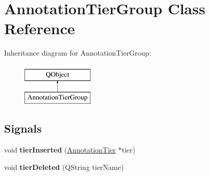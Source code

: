\hypertarget{class_annotation_tier_group}{}\section{Annotation\+Tier\+Group Class Reference}
\label{class_annotation_tier_group}
Inheritance diagram for Annotation\+Tier\+Group\+:\begin{figure}[H]
\begin{center}
\leavevmode
\includegraphics[height=2.000000cm]{class_annotation_tier_group}
\end{center}
\end{figure}
\subsection*{Signals}
\begin{DoxyCompactItemize}
\item 
\mbox{\label{class_annotation_tier_group_a13088d0f3786f1d1b171d99623856efc}} 
void {\bfseries tier\+Inserted} (\hyperlink{class_annotation_tier}{Annotation\+Tier} $\ast$tier)
\item 
\mbox{\label{class_annotation_tier_group_af567945dc914d185458e5e5b33ac2351}} 
void {\bfseries tier\+Deleted} (Q\+String tier\+Name)
\end{DoxyCompactItemize}
